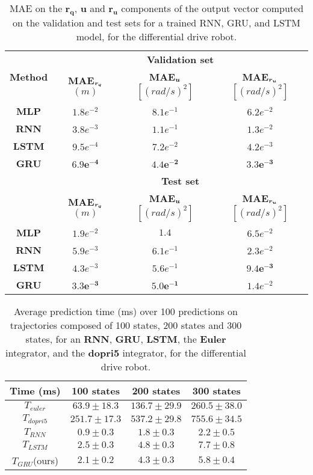 \begin{table}[t]
\centering
\begin{tabular}{ | c | c  c  c | }
\hline
    \multirow{2}{*}{\textbf{Method}} & \multicolumn{3}{c|}{\textbf{Validation set}} \\ \cline{2-4}
    & \textbf{MAE$_{\boldsymbol{r_q}}$} $(m)$  & \textbf{MAE$_{\boldsymbol{u}}$} $[(rad/s)^2]$ & \textbf{MAE$_{\boldsymbol{r_u}}$} $[(rad/s)^2]$ \\ \hline
{\textbf{MLP}} & $1.8e^{-2}$ & $8.1e^{-1}$ & $6.2e^{-2}$ \\ 
{\textbf{RNN}} & $3.8e^{-3}$ & $1.1e^{-1}$ & $1.3e^{-2}$ \\ 
{\textbf{LSTM}} & $9.5e^{-4}$ & $7.2e^{-2}$ & $4.2e^{-3}$ \\ 
{\textbf{GRU}} & $\boldsymbol{6.9e^{-4}}$ & $\boldsymbol{4.4e^{-2}}$ & $\boldsymbol{3.3e^{-3}}$ \\ 
\hline
    & \multicolumn{3}{c|}{\textbf{Test set}}\\ \cline{2-4}
    & \textbf{MAE$_{\boldsymbol{r_q}}$} $(m)$  & \textbf{MAE$_{\boldsymbol{u}}$} $[(rad/s)^2]$ & \textbf{MAE$_{\boldsymbol{r_u}}$} $[(rad/s)^2]$ \\ \hline
{\textbf{MLP}} & $1.9e^{-2}$ & $1.4$ & $6.5e^{-2}$ \\ 
{\textbf{RNN}} &  $5.9e^{-3}$ & $6.1e^{-1}$ & $2.3e^{-2}$ \\ 
{\textbf{LSTM}} & $4.3e^{-3}$ & $5.6e^{-1}$ & $\boldsymbol{9.4e^{-3}}$ \\ 
{\textbf{GRU}} & $\boldsymbol{3.3e^{-3}}$ & $5\boldsymbol{.0e^{-1}}$ & $1.4e^{-2}$ \\ 
\hline
    
\end{tabular}
\caption{
MAE on the $\boldsymbol{r_q}$, $\boldsymbol{u}$ and $\boldsymbol{r_u}$ components of the output vector computed on the validation and test sets for a trained RNN, GRU, and LSTM model, for the differential drive robot.}
    \label{tab:NN_results_table_Q_unic}
\end{table}

\begin{table}[t]
\centering
\begin{tabular}{ | c | c  c  c | }
\hline
    \textbf{Time (ms)} & 100 states  & 200 states & 300 states \\ \hline
    $T_{euler}$ & $63.9 \pm 18.3$ & $136.7 \pm 29.9$ & $260.5 \pm 38.0$ \\ 
$T_{dopri5}$ & $251.7 \pm 17.3$ & $537.2 \pm 29.8$ & $755.6 \pm 34.5$ \\ 
$T_{RNN}$ & $\boldsymbol{0.9} \pm 0.3$ & $\boldsymbol{1.8} \pm 0.3$ & $\boldsymbol{2.2} \pm 0.5$ \\ 
$T_{LSTM}$ & $2.5 \pm 0.3$ & $4.8 \pm 0.3$ & $7.7 \pm 0.8$ \\ 
$T_{GRU}$(ours) & $2.1 \pm 0.2$ & $4.3 \pm 0.3$ & $5.8 \pm 0.4$  \\ \hline
\end{tabular}
\caption{
Average prediction time (ms) over 100 predictions on trajectories composed of 100 states, 200 states and 300 states, for an \textbf{RNN}, \textbf{GRU}, \textbf{LSTM}, the \textbf{Euler} integrator, and the \textbf{dopri5} integrator, for the differential drive robot.}
    \label{tab:timepred_unic}
\end{table}